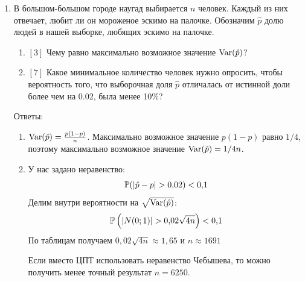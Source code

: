 \documentclass[12pt, a4paper]{article}\usepackage[]{graphicx}\usepackage[]{color}
\begin{document}
\begin{enumerate}
\begin{enumerate}
\end{enumerate}



\item В большом-большом городе наугад выбирается $n$ человек. Каждый из них отвечает, любит ли он мороженое эскимо на палочке. Обозначим $\hat{p}$ долю людей в нашей выборке, любящих эскимо на палочке.
\begin{enumerate}
\item $[3]$ Чему равно максимально возможное значение $\Var(\hat{p})$?
\item $[7]$ Какое минимальное количество человек нужно опросить, чтобы вероятность того, что выборочная доля $\hat{p}$ отличалась от истинной доли более чем на 0.02, была менее 10\%?
\end{enumerate}


Ответы:
\begin{enumerate}
\item $\Var(\hat{p})=\frac{p(1-p)}{n}$. Максимально возможное значение $p(1-p)$ равно $1/4$, поэтому максимально возможное значение $\Var(\hat{p})=1/4n$.
\item У нас задано неравенство:
\begin{equation}
\P(|\hat{p}-p|>0{,}02)<0{,}1
\end{equation}
Делим внутри вероятности на $\sqrt{\Var(\hat{p})}$:
\begin{equation}
\P\left( |N(0;1)| > 0{,}02\sqrt{4n} \right)<0{,}1
\end{equation}
По таблицам получаем $0{,}02\sqrt{4n}\approx 1{,}65$ и $n\approx 1691$


Если вместо ЦПТ использовать неравенство Чебышева, то можно получить менее точный результат $n=6250$.

\end{enumerate}




\end{enumerate}
\end{document}
